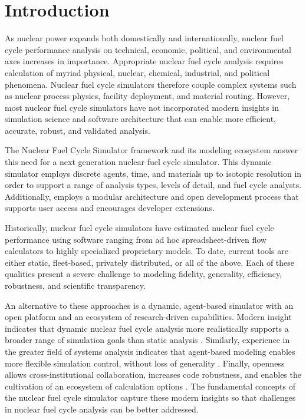 
\section{Introduction}



As nuclear power expands both domestically and internationally, nuclear fuel cycle
performance analysis on technical, economic, political, and environmental axes increases 
in importance. Appropriate nuclear fuel cycle analysis requires calculation of myriad physical, nuclear, 
chemical, industrial, and political phenomena. Nuclear fuel cycle simulators 
therefore couple complex systems such as nuclear process physics, 
facility deployment, and material routing. However, most nuclear fuel cycle 
simulators have not incorporated modern insights in simulation science and 
software architecture that can enable more efficient, accurate, robust, and 
validated analysis. 

The \Cyclus Nuclear Fuel Cycle Simulator framework and 
its modeling ecosystem answer this need for a next generation nuclear fuel cycle 
simulator. This dynamic simulator employs discrete agents, time, and materials 
up to isotopic resolution in order to support a range of analysis types, levels of 
detail, and fuel cycle analysts.
Additionally, \Cyclus employs a modular architecture and 
open development process that supports user access and 
encourages developer extensions.

Historically, nuclear fuel cycle simulators have estimated 
nuclear fuel cycle performance using software 
ranging from ad hoc spreadsheet-driven flow calculators to highly specialized 
proprietary models. To date, current tools are either static, fleet-based, 
privately distributed, or all of the above. Each of these qualities present a 
severe challenge to modeling fidelity, generality, efficiency, robustness, and 
scientific transparency. 

An alternative to these approaches is a dynamic, agent-based simulator with an 
open platform and an ecosystem of research-driven capabilities.  Modern 
insight indicates that dynamic nuclear fuel cycle analysis more realistically 
supports a broader range of simulation goals than static analysis 
\cite{piet_dynamic_2011}. Similarly, experience in the greater field of systems 
analysis indicates that agent-based modeling enables more flexible simulation 
control, without loss of generality \cite{macal_agent-based_2010}. Finally, openness 
allows cross-institutional collaboration, increases code robustness, and 
enables the cultivation of an ecosystem of calculation options 
\cite{softwarecarpentryresource}.  The fundamental concepts of the \Cyclus 
nuclear fuel cycle simulator capture these modern insights so that challenges 
in nuclear fuel cycle analysis can be better addressed. 

